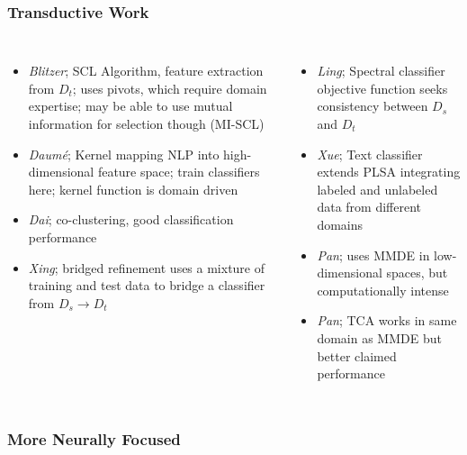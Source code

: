 \documentclass[t,handout]{beamer}
\begin{document}
\begin{frame}
\frametitle{Transductive Work}
\begin{columns}
\footnotesize{
\begin{itemize}
\item \textit{Blitzer}; SCL Algorithm, feature extraction from $D_{t}$; uses pivots, which require domain expertise; may be able to use mutual information for selection though (MI-SCL)
\item \textit{Daum\'{e}}; Kernel mapping NLP into high-dimensional feature space; train classifiers here; kernel function is domain driven
\item \textit{Dai}; co-clustering, good classification performance
\item \textit{Xing}; bridged refinement uses a mixture of training and test data to bridge a classifier from $D_{s} \rightarrow D_{t}$
\end{itemize}
}

\footnotesize{
\begin{itemize}
\item \textit{Ling}; Spectral classifier objective function seeks consistency between $D_{s}$ and $D_{t}$
\item \textit{Xue}; Text classifier extends PLSA integrating labeled and unlabeled data from different domains
\item \textit{Pan}; uses MMDE in low-dimensional spaces, but computationally intense 
\item \textit{Pan}; TCA works in same domain as MMDE but better claimed performance
\end{itemize}
}

\end{columns}
\end{frame}

\begin{frame}
\frametitle{More Neurally Focused}

\end{frame}
\end{document}
